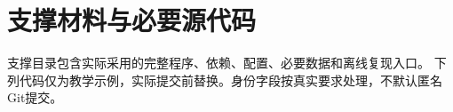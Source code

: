 \section{支撑材料与必要源代码}
支撑目录包含实际采用的完整程序、依赖、配置、必要数据和离线复现入口。
下列代码仅为教学示例，实际提交前替换。身份字段按真实要求处理，不默认匿名Git提交。

